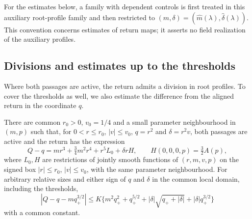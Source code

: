 For the estimates below, a family with dependent controls is first treated
in this auxiliary root-profile family and then restricted to
$(m,\delta)=(\widehat m(\lambda),\widehat\delta(\lambda))$.
This convention concerns estimates of return maps; it asserts no field
realization of the auxiliary profiles.

\subsection{Divisions and estimates up to the thresholds}

Where both passages are active, the return admits a division in root
profiles. To cover the thresholds as well, we also estimate the difference
from the aligned return in the coordinate $q$.

\begin{lemma}
\label{lem:exact-value-division}
There are common $r_0>0$, $v_0=1/4$ and a small parameter neighbourhood
in $(m,p)$
such that, for $0<r\le r_0$, $|v|\le v_0$, $q=r^2$ and $\delta=r^2v$,
both passages are active and the return has the expression
\begin{equation}\label{eq:actual-both-active-division}
 Q-q=mr^3+\tfrac34m^2r^4+r^5L_0+\delta rH,
 \qquad H(0,0,0,p)=\tfrac32A(p),
\end{equation}
where $L_0,H$ are restrictions of jointly smooth functions of $(r,m,v,p)$
on the signed box $|r|\le r_0$, $|v|\le v_0$, with the same parameter
neighbourhood. For arbitrary relative sizes and either sign of
$q$ and $\delta$ in the common local domain, including the thresholds,
\begin{equation}\label{eq:quartic-global-value}
 |Q-q-mq_+^{3/2}|
 \le K\{m^2q_+^2+q_+^{5/2}
       +|\delta|\sqrt{q_++|\delta|}+|\delta|q_+^{3/2}\}
\end{equation}
with a common constant.
\end{lemma}

